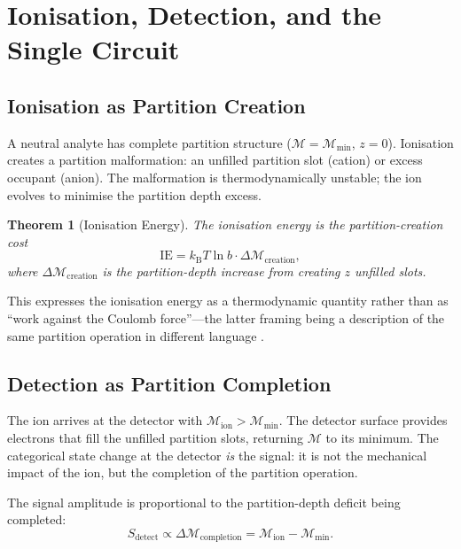 \documentclass[twocolumn,10pt,a4paper]{article}
\newtheorem{theorem}{Theorem}[section]
\theoremstyle{definition}
\theoremstyle{remark}
\newcommand{\kB}{k_{\mathrm{B}}}
\newcommand{\Depth}{\mathcal{M}}
\begin{document}
\section{Ionisation, Detection, and the Single Circuit}
\label{sec:circuit}

\subsection{Ionisation as Partition Creation}

A neutral analyte has complete partition structure ($\Depth = \Depth_{\min}$, $z = 0$). Ionisation creates a partition malformation: an unfilled partition slot (cation) or excess occupant (anion). The malformation is thermodynamically unstable; the ion evolves to minimise the partition depth excess.

\begin{theorem}[Ionisation Energy]
\label{thm:ionisation}
The ionisation energy is the partition-creation cost
\begin{equation}
\mathrm{IE} = \kB T \ln b \cdot \Delta\Depth_{\mathrm{creation}},
\label{eq:ionisation}
\end{equation}
where $\Delta\Depth_{\mathrm{creation}}$ is the partition-depth increase from creating $z$ unfilled slots.
\end{theorem}

This expresses the ionisation energy as a thermodynamic quantity rather than as ``work against the Coulomb force''---the latter framing being a description of the same partition operation in different language \citep{atkins2018,gross2017}.

\subsection{Detection as Partition Completion}

The ion arrives at the detector with $\Depth_{\mathrm{ion}} > \Depth_{\min}$. The detector surface provides electrons that fill the unfilled partition slots, returning $\Depth$ to its minimum. The categorical state change at the detector \emph{is} the signal: it is not the mechanical impact of the ion, but the completion of the partition operation.

The signal amplitude is proportional to the partition-depth deficit being completed:
\begin{equation}
S_{\mathrm{detect}} \propto \Delta\Depth_{\mathrm{completion}} = \Depth_{\mathrm{ion}} - \Depth_{\min}.
\label{eq:detection_signal}
\end{equation}
\end{document}

